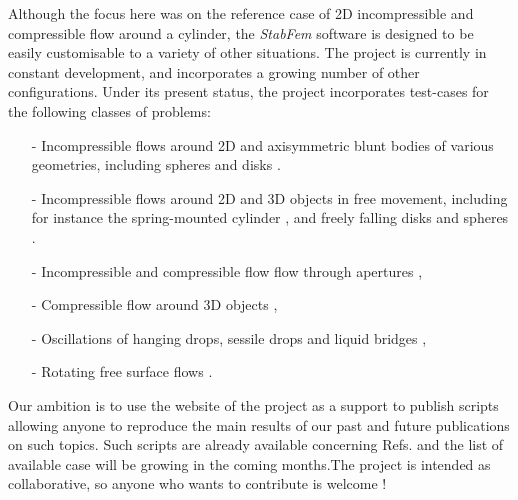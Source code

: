 \documentclass[twocolumn,10pt]{asme2ej}
\begin{document}
Although the focus here was on the reference case of 2D incompressible and compressible flow around a cylinder, the {\em StabFem } software is designed to be easily customisable to a variety of other situations.
The project is currently in constant development, and incorporates a growing number of other configurations.
Under its present status, the project incorporates test-cases for the following classes of problems:
\begin{itemize}
\item[-] Incompressible flows around 2D and axisymmetric blunt bodies of various geometries, including spheres and disks \cite{Tchoufag2015}. 
\item[-] Incompressible flows around 2D and 3D objects in free movement, including for instance the spring-mounted cylinder \cite{Navrose}, and freely falling disks and spheres \cite{tchoufag2014global}.
\item[-] Incompressible and compressible flow flow through apertures \cite{FabreISMA,longobardi2018IUTAM}, 
\item[-] Compressible flow around 3D objects  \cite{meliga2010effect},
\item[-] Oscillations of hanging drops, sessile drops and liquid bridges \cite{Chireux2015},
\item[-] Rotating free surface flows \cite{mougel2017instabilities}.
\end{itemize}
Our ambition is to use the website of the project as a support to publish scripts allowing anyone to reproduce the main results of our past and future publications
on such topics.  Such scripts are already available concerning Refs. \cite{Tchoufag2015,longobardi2018IUTAM,Chireux2015,mougel2017instabilities} and the list of available case will be growing in the coming months.The project is intended as collaborative, so anyone who wants to contribute is welcome !








\appendix


\end{document}
